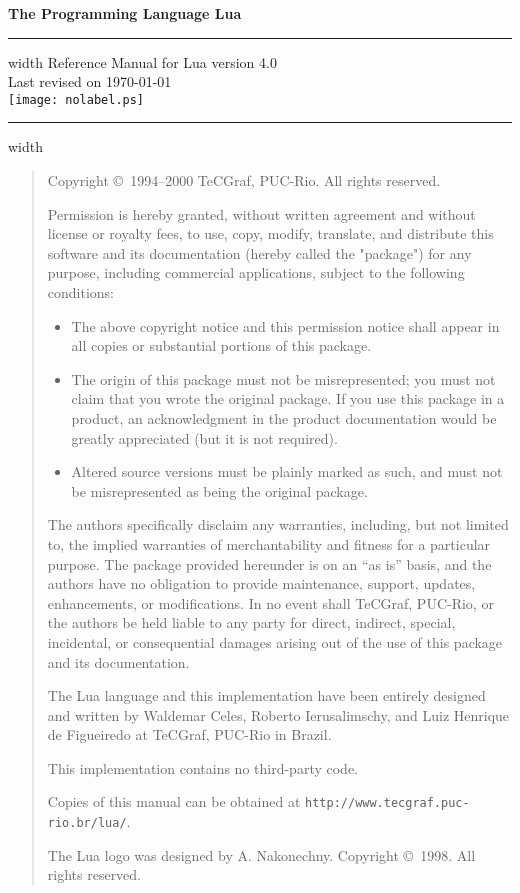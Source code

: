 \documentclass[11pt]{article}
\newcommand{\Version}{4.0}
\begin{document}
\thispagestyle{empty}
\pagestyle{empty}

{
\parindent=0pt
{\LARGE\bf
The Programming Language Lua}
\hfill
\vskip4pt \hrule height 4pt width \hsize \vskip4pt
\hfill
Reference Manual for Lua version \Version
\\
\null
\hfill
Last revised on \today
\\
\vfill
\centering
\texttt{[image: nolabel.ps]}
\vfill
\vskip4pt \hrule height 2pt width \hsize
}

\newpage
\begin{quotation}
\parskip=10pt
\footnotesize
\null\vfill

\noindent
Copyright \copyright\ 1994--2000 TeCGraf, PUC-Rio.  All rights reserved.

\noindent
Permission is hereby granted, without written agreement and without license
or royalty fees, to use, copy, modify, translate, and distribute
this software and its documentation (hereby called the "package")
for any purpose, including commercial applications, subject to
the following conditions:
\begin{itemize}
\item The above copyright notice and this permission notice shall appear in all
   copies or substantial portions of this package.

\item The origin of this package must not be misrepresented; you must not
   claim that you wrote the original package. If you use this package in a
   product, an acknowledgment in the product documentation would be greatly
   appreciated (but it is not required).

\item Altered source versions must be plainly marked as such, and must not be
   misrepresented as being the original package.
\end{itemize}
The authors specifically disclaim any warranties, including, but not limited
to, the implied warranties of merchantability and fitness for a particular
purpose.  The package provided hereunder is on an ``as is'' basis, and the
authors have no obligation to provide maintenance, support, updates,
enhancements, or modifications.  In no event shall TeCGraf, PUC-Rio, or the
authors be held liable to any party for direct, indirect, special,
incidental, or consequential damages arising out of the use of this package
and its documentation.

\noindent
The Lua language and this implementation have been entirely designed and
written by Waldemar Celes, Roberto Ierusalimschy, and Luiz Henrique de
Figueiredo at TeCGraf, PUC-Rio in Brazil.

\noindent
This implementation contains no third-party code.

\noindent
Copies of this manual can be obtained at
\verb|http://www.tecgraf.puc-rio.br/lua/|.

\bigskip
\noindent
The Lua logo was designed by A. Nakonechny.
Copyright \copyright\ 1998.  All rights reserved.
\end{quotation}
\newpage
\end{document}
